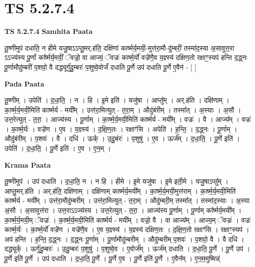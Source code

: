 \documentclass[17pt]{extarticle}
\begin{document}
\section{ TS 5.2.7.4 }

\textbf{TS 5.2.7.4 } \newline
\textbf{Samhita Paata} \newline

तू॒ष्णीमुप॑ दधाति॒ न हीमे यजु॒षाऽऽप्तु॒मर्.ह॑ति॒ दक्षि॑णां कार्ष्मर्य॒मयी॒-मुत्त॑रा॒मौ-दु॑म्बरीं॒ तस्मा॑द॒स्या अ॒सावुत्त॒रा ऽऽज्य॑स्य पू॒र्णां का᳚र्ष्मर्य॒मयीं॒ ॅवज्रो॒ वा आज्यं॒ ॅवज्रः॑ कार्ष्म॒र्यो॑ वज्रे॑णै॒व य॒ज्ञ्स्य॑ दक्षिण॒तो रक्षाꣳ॒॒स्यप॑ हन्ति द॒द्ध्नः पू॒र्णामौदु॑म्बरीं प॒शवो॒ वै दद्ध्यूर्गु॑दु॒म्बरः॑ प॒शुष्वे॒वोर्जं॑ दधाति पू॒र्णे उप॑ दधाति पू॒र्णे ए॒वैन॑ - [  ] \newline

\textbf{Pada Paata} \newline

तू॒ष्णीम् । उपेति॑ । द॒धा॒ति॒ । न । हि । इ॒मे इति॑ । यजु॑षा । आप्तु᳚म् । अर्.ह॑ति । दक्षि॑णाम् । का॒र्ष्म॒र्य॒मयी॒मिति॑ कार्ष्मर्य - मयी᳚म् । उत्त॑रा॒मित्युत् - त॒रा॒म् । औदु॑बंरीम् । तस्मा᳚त् । अ॒स्याः । अ॒सौ । उत्त॒रेत्युत् - त॒रा॒ । आज्य॑स्य । पू॒र्णाम् । का॒र्ष्म॒र्य॒मयी॒मिति॑ कार्ष्मर्य - मयी᳚म् । वज्रः॑ । वै । आज्य᳚म् । वज्रः॑ । का॒र्ष्म॒र्यः॑ । वज्रे॑ण । ए॒व । य॒ज्ञ्स्य॑ । द॒क्षि॒ण॒तः । रक्षाꣳ॑सि । अपेति॑ । ह॒न्ति॒ । द॒द्ध्नः । पू॒र्णाम् । औदु॑बंरीम् । प॒शवः॑ । वै । दधि॑ । ऊर्क् । उ॒दु॒बंरः॑ । प॒शुषु॑ । ए॒व । ऊर्ज᳚म् । द॒धा॒ति॒ । पू॒र्णे इति॑ । उपेति॑ । द॒धा॒ति॒ । पू॒र्णे इति॑ । ए॒व । ए॒न॒म् ।  \newline


\textbf{Krama Paata} \newline

तू॒ष्णीमुप॑ । उप॑ दधाति । द॒धा॒ति॒ न । न हि । हीमे । इ॒मे यजु॑षा । इ॒मे इती॒मे । यजु॒षाऽप्तु᳚म् । आप्तु॒मर्.ह॑ति । अर्.ह॑ति॒ दक्षि॑णाम् । दक्षि॑णाम् कार्ष्मर्य॒मयी᳚म् । का॒र्ष्म॒र्य॒मयी॒मुत्त॑राम् । का॒र्ष्म॒र्य॒मयी॒मिति॑ कार्ष्मर्य - मयी᳚म् । उत्त॑रा॒मौदु॑म्बरीम् । उत्त॑रा॒मित्युत् - त॒रा॒म् । औदु॑म्बरी॒म् तस्मा᳚त् । तस्मा॑द॒स्याः । अ॒स्या अ॒सौ । अ॒सावुत्त॑रा । उत्त॒राऽऽज्य॑स्य । उत्त॒रेत्युत् - त॒रा॒ । आज्य॑स्य पू॒र्णाम् । पू॒र्णाम् का᳚र्ष्मर्य॒मयी᳚म् । का॒र्ष्म॒र्य॒मयी॒म् ॅवज्रः॑ । का॒र्ष्म॒र्य॒मयी॒मिति॑ कार्ष्मर्य - मयी᳚म् । वज्रो॒ वै । 
वा आज्य᳚म् । आज्य॒म् ॅवज्रः॑ । वज्रः॑ कार्ष्म॒र्यः॑ । का॒र्ष्म॒र्यो॑ वज्रे॑ण । वज्रे॑णै॒व । ए॒व य॒ज्ञ्स्य॑ । य॒ज्ञ्स्य॑ दक्षिण॒तः । द॒क्षि॒ण॒तो रक्षाꣳ॑सि । रक्षाꣳ॒॒स्यप॑ । अप॑ हन्ति । ह॒न्ति॒ द॒द्ध्नः । द॒द्ध्नः पू॒र्णाम् । पू॒र्णामौदु॑म्बरीम् । औदु॑म्बरीम् प॒शवः॑ । प॒शवो॒ वै । वै दधि॑ । दद्ध्यूर्क् । ऊर्गु॑दु॒म्बरः॑ । उ॒दु॒म्बरः॑ प॒शुषु॑ । प॒शुष्वे॒व । ए॒वोर्ज᳚म् । ऊर्ज॑म् दधाति । द॒धा॒ति॒ पू॒र्णे । पू॒र्णे उप॑ । पू॒र्णे इति॑ पू॒र्णे । उप॑ दधाति । द॒धा॒ति॒ पू॒र्णे । पू॒र्णे ए॒व । पू॒र्णे इति॑ पू॒र्णे । ए॒वैन᳚म् । ए॒न॒म॒मुष्मिन्न्॑ \newline
\end{document}
